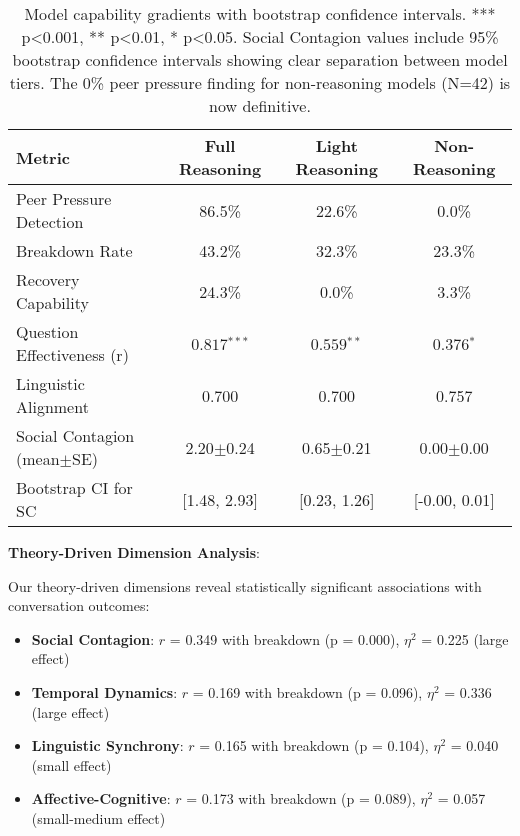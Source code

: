 \documentclass[11pt,letterpaper]{article}
\newcommand{\nonReasoningCount}{42}
\newcommand{\socialContagionBreakdownCorr}{0.349}
\newcommand{\socialContagionBreakdownP}{0.000}
\newcommand{\socialContagionEtaSquared}{0.225}
\newcommand{\temporalDynamicsBreakdownCorr}{0.169}
\newcommand{\temporalDynamicsBreakdownP}{0.096}
\newcommand{\temporalDynamicsEtaSquared}{0.336}
\newcommand{\linguisticSynchronyBreakdownCorr}{0.165}
\newcommand{\linguisticSynchronyBreakdownP}{0.104}
\newcommand{\linguisticSynchronyEtaSquared}{0.040}
\newcommand{\affectiveCognitiveBreakdownCorr}{0.173}
\newcommand{\affectiveCognitiveBreakdownP}{0.089}
\newcommand{\affectiveCognitiveEtaSquared}{0.057}
\newcommand{\socialContagionFullMean}{2.20}
\newcommand{\socialContagionFullSE}{0.24}
\newcommand{\socialContagionFullCI}{[1.48, 2.93]}
\newcommand{\socialContagionLightMean}{0.65}
\newcommand{\socialContagionLightSE}{0.21}
\newcommand{\socialContagionLightCI}{[0.23, 1.26]}
\newcommand{\socialContagionNoMean}{0.00}
\newcommand{\socialContagionNoSE}{0.00}
\newcommand{\socialContagionNoCI}{[-0.00, 0.01]}
\newcommand{\fullReasoningPeerPressure}{86.5\%}
\newcommand{\lightReasoningPeerPressure}{22.6\%}
\newcommand{\nonReasoningPeerPressure}{0.0\%}
\newcommand{\fullReasoningBreakdown}{43.2\%}
\newcommand{\lightReasoningBreakdown}{32.3\%}
\newcommand{\nonReasoningBreakdown}{23.3\%}
\newcommand{\fullReasoningRecovery}{24.3\%}
\newcommand{\lightReasoningRecovery}{0.0\%}
\newcommand{\nonReasoningRecovery}{3.3\%}
\newcommand{\fullQuestionCorrelation}{0.817}
\newcommand{\lightQuestionCorrelation}{0.559}
\newcommand{\nonQuestionCorrelation}{0.376}
\newcommand{\fullLinguisticAlignment}{0.700}
\newcommand{\nonLinguisticAlignment}{0.757}
\begin{document}
\begin{table}[h]
\centering
\begin{tabular}{lccc}
\toprule
Metric & Full Reasoning & Light Reasoning & Non-Reasoning \\
\midrule
Peer Pressure Detection & \fullReasoningPeerPressure{} & \lightReasoningPeerPressure{} & \nonReasoningPeerPressure{} \\
Breakdown Rate & \fullReasoningBreakdown{} & \lightReasoningBreakdown{} & \nonReasoningBreakdown{} \\
Recovery Capability & \fullReasoningRecovery{} & \lightReasoningRecovery{} & \nonReasoningRecovery{} \\
Question Effectiveness (r) & $\fullQuestionCorrelation{}^{***}$ & $\lightQuestionCorrelation{}^{**}$ & $\nonQuestionCorrelation{}^{*}$ \\
Linguistic Alignment & \fullLinguisticAlignment{} & \fullLinguisticAlignment{} & \nonLinguisticAlignment{} \\
Social Contagion (mean$\pm$SE) & \socialContagionFullMean{}$\pm$\socialContagionFullSE{} & \socialContagionLightMean{}$\pm$\socialContagionLightSE{} & \socialContagionNoMean{}$\pm$\socialContagionNoSE{} \\
Bootstrap CI for SC & \socialContagionFullCI{} & \socialContagionLightCI{} & \socialContagionNoCI{} \\
\bottomrule
\end{tabular}
\caption{Model capability gradients with bootstrap confidence intervals. *** p<0.001, ** p<0.01, * p<0.05. Social Contagion values include 95\% bootstrap confidence intervals showing clear separation between model tiers. The 0\% peer pressure finding for non-reasoning models (N=\nonReasoningCount{}) is now definitive.}
\label{tab:capability_gradients}
\end{table}

\textbf{Theory-Driven Dimension Analysis}:

Our theory-driven dimensions reveal statistically significant associations with conversation outcomes:

\begin{itemize}
    \item \textbf{Social Contagion}: $r$ = \socialContagionBreakdownCorr{} with breakdown (p = \socialContagionBreakdownP{}), $\eta^2$ = \socialContagionEtaSquared{} (large effect)
    \item \textbf{Temporal Dynamics}: $r$ = \temporalDynamicsBreakdownCorr{} with breakdown (p = \temporalDynamicsBreakdownP{}), $\eta^2$ = \temporalDynamicsEtaSquared{} (large effect)
    \item \textbf{Linguistic Synchrony}: $r$ = \linguisticSynchronyBreakdownCorr{} with breakdown (p = \linguisticSynchronyBreakdownP{}), $\eta^2$ = \linguisticSynchronyEtaSquared{} (small effect)
    \item \textbf{Affective-Cognitive}: $r$ = \affectiveCognitiveBreakdownCorr{} with breakdown (p = \affectiveCognitiveBreakdownP{}), $\eta^2$ = \affectiveCognitiveEtaSquared{} (small-medium effect)
\end{itemize}
\end{document}
